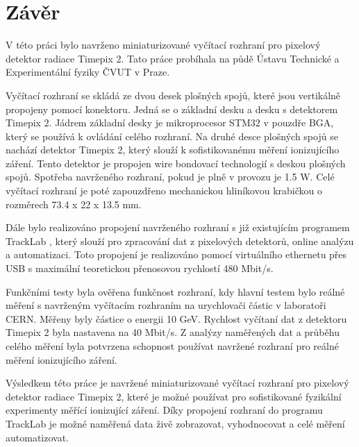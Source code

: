 \chapter{Závěr}

V této práci bylo navrženo miniaturizované vyčítací rozhraní pro pixelový detektor radiace Timepix 2. Tato práce probíhala na půdě Ústavu Technické a Experimentální fyziky ČVUT v Praze. 

Vyčítací rozhraní se skládá ze dvou desek plošných spojů, které jsou vertikálně propojeny pomocí konektoru. Jedná se o základní desku a desku s detektorem Timepix 2. Jádrem základní desky je mikroprocesor STM32 v pouzdře BGA, který se používá k ovládání celého rozhraní. Na druhé desce plošných spojů se nachází detektor Timepix 2, který slouží k sofistikovanému měření ionizujícího záření. Tento detektor je propojen wire bondovací technologií s deskou plošných spojů. Spotřeba navrženého rozhraní, pokud je plně v provozu je 1.5 W. Celé vyčítací rozhraní je poté zapouzdřeno mechanickou hliníkovou krabičkou o rozměrech 73.4 x 22 x 13.5 mm.

Dále bylo realizováno propojení navrženého rozhraní s již existujícím programem TrackLab \cite{Manek_2024}, který slouží pro zpracování dat z pixelových detektorů, online analýzu a automatizaci. Toto propojení je realizováno pomocí virtuálního ethernetu přes USB s maximální teoretickou přenosovou rychlostí 480 Mbit/s.
 
Funkčními testy byla ověřena funkčnost rozhraní, kdy hlavní testem bylo reálné měření s navrženým vyčítacím rozhraním na urychlovači částic v laboratoři CERN. Měřeny byly částice o energii 10 GeV. Rychlost vyčítaní dat z detektoru Timepix 2 byla nastavena na 40 Mbit/s. Z analýzy naměřených dat a průběhu celého měření byla potvrzena schopnost používat navržené rozhraní pro reálné měření ionizujícího záření. 
\newline
\par
Výsledkem této práce je navržené miniaturizované vyčítací rozhraní pro pixelový detektor radiace Timepix 2, které je možné používat pro sofistikované fyzikální experimenty měřící ionizující záření. Díky propojení rozhraní do programu TrackLab je možné naměřená data živě zobrazovat, vyhodnocovat a celé měření automatizovat. 

